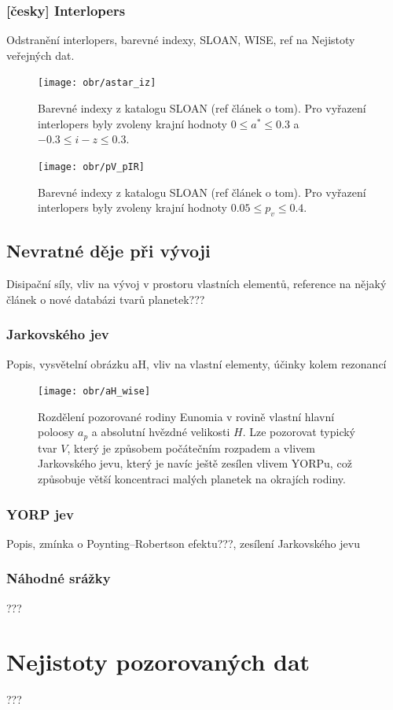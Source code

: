 \documentclass[A4paper, 12pt, oneside]{book}
\begin{document}
\subsubsection{[česky] Interlopers}
Odstranění interlopers, barevné indexy, SLOAN, WISE, ref na Nejistoty veřejných dat.
\begin{figure}[!htb]
	\centering
	\texttt{[image: obr/astar\_iz]}
	\caption{Barevné indexy z katalogu SLOAN (ref článek o tom). Pro vyřazení interlopers byly zvoleny krajní hodnoty $0\leq a^* \leq 0.3$ a $-0.3\leq i-z \leq 0.3$.}
	\label{astar_iz}
\end{figure}
\begin{figure}[!htb]
	\centering
	\texttt{[image: obr/pV\_pIR]}
	\caption{Barevné indexy z katalogu SLOAN (ref článek o tom). Pro vyřazení interlopers byly zvoleny krajní hodnoty $0.05 \leq p_v \leq 0.4$.}
	\label{pV_pIR}
\end{figure}
\subsection{Nevratné děje při vývoji}
Disipační síly, vliv na vývoj v prostoru vlastních elementů, reference na nějaký článek o nové databázi tvarů planetek???
\subsubsection{Jarkovského jev} \label{sec:jarko}
Popis, vysvětelní obrázku aH, vliv na vlastní elementy, účinky kolem rezonancí
\begin{figure}[!htb]
	\centering
	\texttt{[image: obr/aH\_wise]}
	\caption{Rozdělení pozorované rodiny Eunomia v rovině vlastní hlavní poloosy $a_p$ a absolutní hvězdné velikosti $H$. Lze pozorovat typický tvar $V$, který je způsobem počátečním rozpadem a vlivem Jarkovského jevu, který je navíc ještě zesílen vlivem YORPu, což způsobuje větší koncentraci malých planetek na okrajích rodiny.}
	\label{aH_wise}
\end{figure}
\subsubsection{YORP jev}
Popis, zmínka o Poynting–Robertson efektu???, zesílení Jarkovského jevu
\subsubsection{Náhodné srážky}
???
\section{Nejistoty pozorovaných dat}
???
\end{document}
